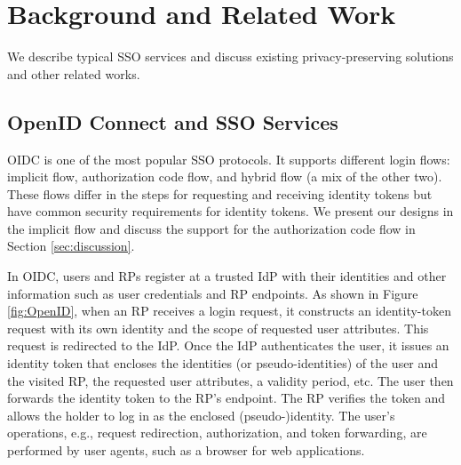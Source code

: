 \section{Background and Related Work}
\label{sec:background}

We describe %
typical SSO services and discuss existing privacy-preserving solutions and other related works.

\subsection{OpenID Connect and SSO Services}
\label{subsec:OIDC}
OIDC is one of the most popular SSO protocols. It supports different login flows: implicit flow, authorization code flow, and hybrid flow (a mix of the other two). These flows differ in the steps for requesting and receiving identity tokens but have common security requirements for identity tokens. We present our designs in the implicit flow and discuss the support for the authorization code flow in Section \ref{sec:discussion}.

In OIDC, users and RPs register at a trusted IdP with their identities
and other information such as user credentials %
and RP endpoints. %
As shown in Figure \ref{fig:OpenID}, when an RP receives a login request, it constructs an identity-token request with its own identity and the scope of requested user attributes.
This request is redirected to the IdP. Once the IdP authenticates the user, it issues an identity token that encloses the identities (or pseudo-identities) of the user and the visited RP, the requested user attributes, a validity period, etc. The user then forwards the identity token to the RP's endpoint. The RP verifies the token and allows the holder to log in as the enclosed (pseudo-)identity. The user's operations, e.g., request redirection, authorization, and token forwarding, are performed by user agents, such as a browser for web applications.

